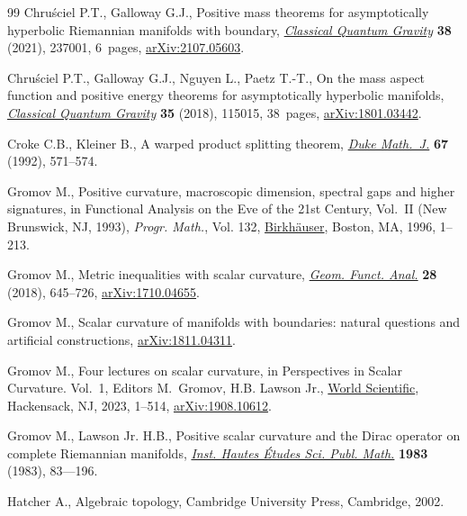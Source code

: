 \documentclass[10pt,a4paper]{amsart}
\numberwithin{equation}{section}
\begin{document}
\begin{thebibliography}{99}
Chru\'sciel P.T., Galloway G.J., Positive mass theorems for asymptotically
  hyperbolic {R}iemannian manifolds with boundary, \href{https://doi.org/10.1088/1361-6382/ac1fd1}{\textit{Classical Quantum
  Gravity}} \textbf{38} (2021), 237001, 6~pages, \href{https://arxiv.org/abs/2107.05603}{arXiv:2107.05603}.

Chru\'sciel P.T., Galloway G.J., Nguyen L., Paetz T.-T., On the mass aspect
  function and positive energy theorems for asymptotically hyperbolic
  manifolds, \href{https://doi.org/10.1088/1361-6382/aabed1}{\textit{Classical Quantum Gravity}} \textbf{35} (2018), 115015,
  38~pages, \href{https://arxiv.org/abs/1801.03442}{arXiv:1801.03442}.

Croke C.B., Kleiner B., A warped product splitting theorem, \href{https://doi.org/10.1215/S0012-7094-92-06723-8}{\textit{Duke
  Math.~J.}} \textbf{67} (1992), 571--574.


Gromov M., Positive curvature, macroscopic dimension, spectral gaps and higher
  signatures, in Functional Analysis on the Eve of the 21st Century,
  {V}ol.~{II} ({N}ew {B}runswick, {NJ}, 1993), \textit{Progr. Math.}, Vol. 132,
  \href{https://doi.org/10.1007/s10107-010-0354-x}{Birkh\"auser}, Boston, MA, 1996, 1--213.

 Gromov  M., Metric inequalities with scalar curvature, \href{https://doi.org/10.1007/s00039-018-0453-z}{\textit{Geom. Funct. Anal.}} \textbf{28} (2018), 645--726,
 \href{https://arxiv.org/abs/1710.04655}{arXiv:1710.04655}.

Gromov M., Scalar curvature of manifolds with boundaries: natural questions and
  artificial constructions, \href{https://arxiv.org/abs/1811.04311}{arXiv:1811.04311}.

Gromov M., Four lectures on scalar curvature, in Perspectives in Scalar
  Curvature. {V}ol.~1, Editors M.~Gromov, H.B. Lawson Jr., \href{https://doi.org/10.1007/10.1142/9789811273223_000}{World Scientific},
  Hackensack, NJ, 2023, 1--514, \href{https://arxiv.org/abs/1908.10612}{arXiv:1908.10612}.

Gromov M., Lawson Jr. H.B., Positive scalar curvature and the {D}irac operator
  on complete {R}iemannian manifolds, \href{https://doi.org/10.1007/BF02953774}{\textit{Inst. Hautes \'Etudes Sci. Publ.
  Math.}} \textbf{1983} (1983), 83---196.

Hatcher A., Algebraic topology, Cambridge University Press, Cambridge, 2002.


\end{thebibliography}
\end{document}
